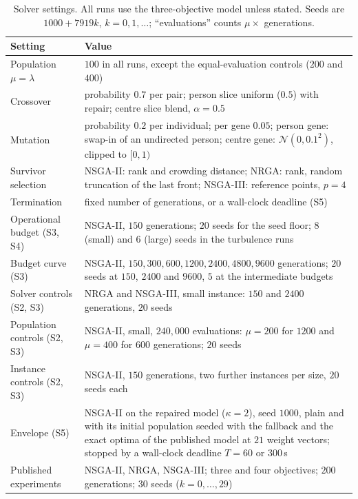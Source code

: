 \documentclass[systems,article,submit,moreauthors,pdftex]{Definitions/mdpi}
\begin{document}
\begin{table}[H]
\centering
\caption{Solver settings. All runs use the three-objective model unless stated. Seeds are
$1000+7919k$, $k=0,1,\dots$; ``evaluations'' counts $\mu\times$ generations.\label{tab:params}}
\small
\begin{tabularx}{\textwidth}{@{}>{\raggedright\arraybackslash}p{3.6cm}>{\raggedright\arraybackslash}X@{}}
\toprule
Setting & Value\\
\midrule
Population $\mu=\lambda$ & $100$ in all runs, except the equal-evaluation controls ($200$ and $400$)\\
Crossover & probability $0.7$ per pair; person slice uniform ($0.5$) with repair; centre slice blend, $\alpha=0.5$\\
Mutation & probability $0.2$ per individual; per gene $0.05$; person gene: swap-in of an undirected person; centre gene: $\mathcal{N}(0,0.1^2)$, clipped to $[0,1)$\\
Survivor selection & NSGA-II: rank and crowding distance; NRGA: rank, random truncation of the last front; NSGA-III: reference points, $p=4$\\
Termination & fixed number of generations, or a wall-clock deadline (S5)\\
\midrule
Operational budget (S3, S4) & NSGA-II, $150$ generations; $20$ seeds for the seed floor; $8$ (small) and $6$ (large) seeds in the turbulence runs\\
Budget curve (S3) & NSGA-II, $150, 300, 600, 1200, 2400, 4800, 9600$ generations; $20$ seeds at $150$, $2400$ and $9600$, $5$ at the intermediate budgets\\
Solver controls (S2, S3) & NRGA and NSGA-III, small instance: $150$ and $2400$ generations, $20$ seeds\\
Population controls (S2, S3) & NSGA-II, small, $240{,}000$ evaluations: $\mu=200$ for $1200$ and $\mu=400$ for $600$ generations; $20$ seeds\\
Instance controls (S2, S3) & NSGA-II, $150$ generations, two further instances per size, $20$ seeds each\\
Envelope (S5) & NSGA-II on the repaired model ($\kappa=2$), seed $1000$, plain and with its initial population seeded with the fallback and the exact optima of the published model at $21$ weight vectors; stopped by a wall-clock deadline $T=60$ or $300$\,s\\
Published experiments~\cite{rabiei2026resilient} & NSGA-II, NRGA, NSGA-III; three and four objectives; $200$ generations; $30$ seeds ($k=0,\dots,29$)\\
\bottomrule
\end{tabularx}
\end{table}
\end{document}
